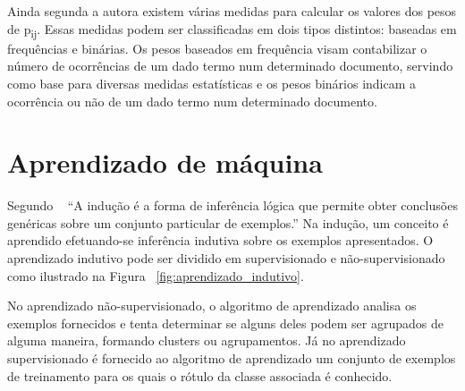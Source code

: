 Ainda segunda a autora existem várias medidas para calcular os valores dos pesos de p\textsubscript{ij}. Essas medidas podem ser classificadas em dois tipos distintos: baseadas em frequências e binárias. Os pesos baseados em frequência visam contabilizar o número de ocorrências de um dado termo num determinado documento, servindo como base para diversas medidas estatísticas e os pesos binários indicam a ocorrência ou não de um dado termo num determinado documento.

\section{Aprendizado de máquina}

Segundo ~\cite{monard_baranauskas:2003} ``A indução é a forma de inferência lógica que permite obter conclusões genéricas sobre um conjunto particular de exemplos.'' Na indução, um conceito é aprendido efetuando-se inferência indutiva sobre os exemplos apresentados. O aprendizado indutivo pode ser dividido em supervisionado e não-supervisionado como ilustrado na Figura ~\ref{fig:aprendizado_indutivo}.  

No aprendizado não-supervisionado, o algoritmo de aprendizado analisa os exemplos fornecidos e tenta determinar se alguns deles podem ser agrupados de alguma maneira, formando clusters ou agrupamentos. Já no aprendizado supervisionado é fornecido ao algoritmo de aprendizado um conjunto de exemplos de treinamento para os quais o rótulo da classe associada é conhecido.

